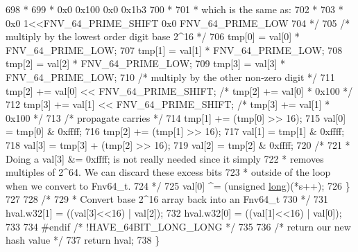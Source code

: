 \begin{DoxyCode}
698 \textcolor{comment}{         *}
699 \textcolor{comment}{         *      0x0     0x100   0x0     0x1b3}
700 \textcolor{comment}{         *}
701 \textcolor{comment}{         * which is the same as:}
702 \textcolor{comment}{         *}
703 \textcolor{comment}{         *      0x0     1<<FNV\_64\_PRIME\_SHIFT   0x0     FNV\_64\_PRIME\_LOW}
704 \textcolor{comment}{         */}
705         \textcolor{comment}{/* multiply by the lowest order digit base 2^16 */}
706         tmp[0] = val[0] * FNV\_64\_PRIME\_LOW;
707         tmp[1] = val[1] * FNV\_64\_PRIME\_LOW;
708         tmp[2] = val[2] * FNV\_64\_PRIME\_LOW;
709         tmp[3] = val[3] * FNV\_64\_PRIME\_LOW;
710         \textcolor{comment}{/* multiply by the other non-zero digit */}
711         tmp[2] += val[0] << FNV\_64\_PRIME\_SHIFT; \textcolor{comment}{/* tmp[2] += val[0] * 0x100 */}
712         tmp[3] += val[1] << FNV\_64\_PRIME\_SHIFT; \textcolor{comment}{/* tmp[3] += val[1] * 0x100 */}
713         \textcolor{comment}{/* propagate carries */}
714         tmp[1] += (tmp[0] >> 16);
715         val[0] = tmp[0] & 0xffff;
716         tmp[2] += (tmp[1] >> 16);
717         val[1] = tmp[1] & 0xffff;
718         val[3] = tmp[3] + (tmp[2] >> 16);
719         val[2] = tmp[2] & 0xffff;
720         \textcolor{comment}{/*}
721 \textcolor{comment}{         * Doing a val[3] &= 0xffff; is not really needed since it simply}
722 \textcolor{comment}{         * removes multiples of 2^64.  We can discard these excess bits}
723 \textcolor{comment}{         * outside of the loop when we convert to Fnv64\_t.}
724 \textcolor{comment}{         */}
725         val[0] ^= (\textcolor{keywordtype}{unsigned} \hyperlink{generate__test__data__lte__sinr_8m_a0eab6be67e93c3411f7a8b53cc297285}{long})(*s++);
726     \}
727 
728     \textcolor{comment}{/*}
729 \textcolor{comment}{     * Convert base 2^16 array back into an Fnv64\_t}
730 \textcolor{comment}{     */}
731     hval.w32[1] = ((val[3]<<16) | val[2]);
732     hval.w32[0] = ((val[1]<<16) | val[0]);
733 
734 \textcolor{preprocessor}{#endif }\textcolor{comment}{/* !HAVE\_64BIT\_LONG\_LONG */}\textcolor{preprocessor}{}
735 
736     \textcolor{comment}{/* return our new hash value */}
737     \textcolor{keywordflow}{return} hval;
738 \}
\end{DoxyCode}
